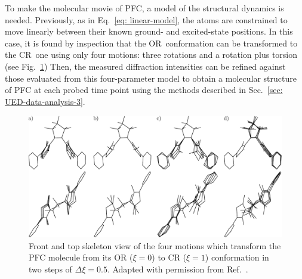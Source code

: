 To make the molecular movie of PFC, a model of the structural dynamics is needed.
Previously, as in Eq.~\eqref{eq: linear-model},
the atoms are constrained to move linearly between their known ground- and excited-state
positions.
In this case, it is found by inspection that the OR~conformation
can be transformed to the CR~one using only four motions: three rotations
and a rotation plus torsion (see Fig.~\ref{fig: DAE-PFC-model})
%
Then, the measured diffraction intensities can be refined against
those evaluated from this four-parameter model to obtain
a molecular structure of PFC at each probed time point
using the methods described in Sec.~\ref{sec: UED-data-analysis-3}.

\begin{figure}[t!]
  \centering
  \includegraphics[width = \textwidth]{Figures/fig_DAE_PFC_model.pdf}
  \caption[Four-motion structure model of PFC ring closure.]{
    Front and top skeleton view of the four motions which transform the PFC molecule
    from its OR ($\xi = 0$) to CR ($\xi = 1$) conformation in two steps of $\Delta \xi = 0.5$.
    Adapted with permission from Ref.~\cite{Jean-Ruel2013}.
  }
  \label{fig: DAE-PFC-model}
\end{figure}

